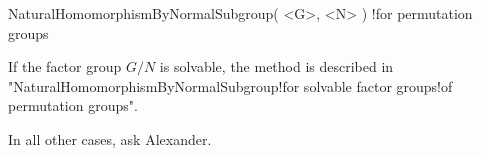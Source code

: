 \stars

\>NaturalHomomorphismByNormalSubgroup( <G>, <N> )%
  !{for permutation groups}

If  the factor  group  $G/N$  is solvable,   the  method is described  in
"NaturalHomomorphismByNormalSubgroup!for   solvable   factor    groups!of
permutation groups".

In all other cases, ask Alexander.

